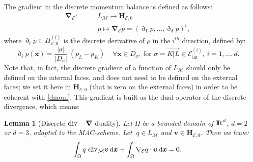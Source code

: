 \documentclass{amsart}
\newtheorem{lm}{Lemma}
\numberwithin{equation}{section}
\begin{document}
The gradient in the discrete momentum balance  is defined as follows:
\begin{equation}\label{eq:grad}
\begin{array}{l|l}
{{{\boldsymbol \nabla}}_{\! {{\mathcal E}}}}:\quad
& \quad
L_{{\mathcal M}} \longrightarrow {{\mathbf{H}_{{{\mathcal E}},0}}} 
\\[1ex] & \displaystyle \quad
p \longmapsto {{{\boldsymbol \nabla}}_{\! {{\mathcal E}}}} p = (\eth_{1} p, \ldots,  \eth_{d} p)^t,
\end{array}
\end{equation}
where $\eth_i p \in  {H_{{{\mathcal E}},0}^{(i)}}$ is the discrete derivative of $p$ in the $i^{th}$ direction, defined by: 
\begin{equation}
 \label{discderive}
 \eth_i p({{\boldsymbol x}}) =  \frac{|{{\sigma}}|}{|D_{{\sigma}}|}\ (p_L - p_K)\, \quad \forall {{\boldsymbol x}}\in D_{{\sigma}}, \ 
 \mbox{for } {{\sigma}}=\overrightarrow{K|L} \in {{\mathcal E}_{\mathrm{int}}^{(i)}}, \ i= 1,\ldots, d.
\end{equation}
Note that, in fact, the discrete gradient of a function of $L_{{\mathcal M}}$ should only be defined on the internal faces, and does not need to be defined on the external faces;
we set it here in  ${{\mathbf{H}_{{{\mathcal E}},0}}}$  (that is zero on the external faces) in order to be coherent with \eqref{dmom}.
This gradient is built as the dual operator of the discrete divergence, which means:

\begin{lm}[Discrete ${{\rm div}}-{{\boldsymbol \nabla}}$ duality]
\label{lem:duality}
Let $\Omega$ be a bounded domain of ${\ifmmode{\rm	I\mkern-3.1mu
R\mkern1mu}\else{\rm I\kern-.18em 
R\hskip1pt\	}\fi\relax}^d$, $d=2$ or $d=3$, adapted to the MAC-scheme.
Let $\ q\in L_{{\mathcal M}}$ and ${{\boldsymbol v}}\in{{\mathbf{H}_{{{\mathcal E}},0}}}$.
Then we have:
\begin{equation}
\int_{\Omega} q  \ {{\rm div}}_{{\mathcal M}}{{\boldsymbol v}} {\, {\rm d}{{\boldsymbol x}}} +\int_{\Omega} \nabla_{{\mathcal E}} q\cdot {{\boldsymbol v}} {\, {\rm d}{{\boldsymbol x}}}  =0 \label{Ndiscret}.
\end{equation}
\end{lm}
\end{document}
